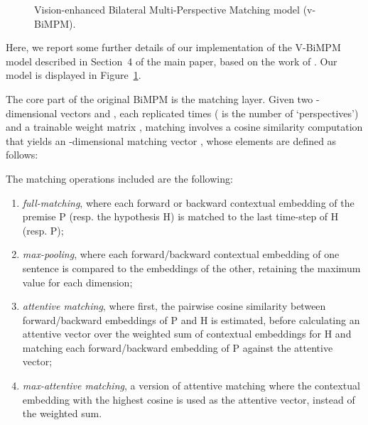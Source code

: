 \documentclass[11pt]{article}
\begin{document}
\begin{figure}[!h]
\begin{center}
{
}

  
   \caption{Vision-enhanced Bilateral Multi-Perspective Matching model (v-BiMPM).}
  \label{fig:vbimpm}
  \end{center}
\end{figure}

 
Here, we report some further details of our implementation of the V-BiMPM model described in Section~4 of the main paper, based on the work of 
. Our model is displayed in Figure~\ref{fig:vbimpm}. 

The core part of the original BiMPM  is the matching layer. Given two -dimensional vectors  and , each replicated  times ( is the number of `perspectives') and a trainable  weight matrix , matching involves a cosine similarity computation that yields an -dimensional matching vector , whose elements are defined as follows:



\noindent
The matching operations included are the following:

\begin{enumerate}
\item {\em full-matching}, where each forward or backward contextual embedding of the premise P (resp. the hypothesis H) is matched to the last time-step of H (resp. P); 
\item {\em max-pooling}, where each forward/backward contextual embedding of one sentence is compared to the embeddings of the other, retaining the maximum value for each dimension; 
\item {\em attentive matching}, where first, the pairwise cosine similarity between forward/backward embeddings of P and H is estimated, before calculating an attentive vector over the weighted sum of contextual embeddings for H and matching each forward/backward embedding of P against the attentive vector;
\item {\em max-attentive matching}, a version of attentive matching where the contextual embedding with the highest cosine is used as the attentive vector, instead of the weighted sum. 
\end{enumerate}
\end{document}
